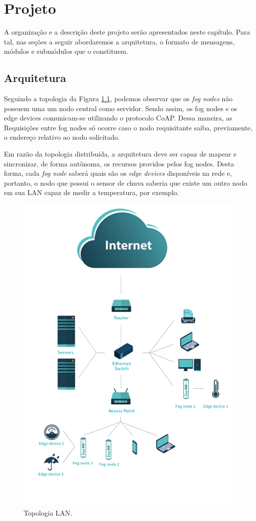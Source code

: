 \chapter{\label{chap:chap3} Projeto}


A organização e a descrição deste projeto serão apresentados neste capítulo.
Para tal, nas seções a seguir abordaremos a arquitetura, o formato de mensagens, módulos e submódulos que o constituem.

\section{Arquitetura}

Seguindo a topologia da Figura \ref{fig:fig14}, podemos observar que os \textit{fog nodes} não possuem uma um nodo central como servidor.
Sendo assim, os fog nodes e os edge devices comunicam-se utilizando o protocolo CoAP.
Dessa maneira, as Requisições entre fog nodes só ocorre caso o nodo requisitante saiba, previamente, o endereço relativo ao nodo solicitado.
 

Em razão da topologia distribuída, a arquitetura deve ser capaz de mapear e sincronizar, de forma autônoma, os recursos providos pelos fog nodes.
Desta forma, cada \textit{fog node} saberá quais são os \textit{edge devices} disponíveis na rede e, portanto,
o nodo que possui o sensor de chuva saberia que existe um outro nodo em sua LAN capaz de medir a temperatura, por exemplo.

\begin{figure}[H]
    \centering\includegraphics[width=.5\textwidth]{fig14.png}
    \caption%
    {\label{fig:fig14} Topologia LAN.}
\end{figure}

